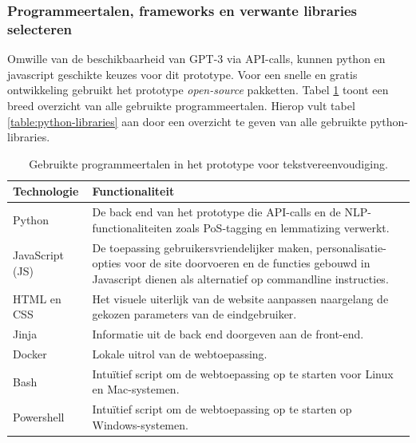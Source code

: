 \subsubsection{Programmeertalen, frameworks en verwante libraries selecteren}

Omwille van de beschikbaarheid van GPT-3 via API-calls, kunnen python en javascript geschikte keuzes voor dit prototype. Voor een snelle en gratis ontwikkeling gebruikt het prototype \textit{open-source} pakketten. Tabel \ref{table:technologies} toont een breed overzicht van alle gebruikte programmeertalen. Hierop vult tabel \ref{table:python-libraries} aan door een overzicht te geven van alle gebruikte python-libraries.

\begin{center}
	\begin{table}[H]
	\begin{tabular}{ | m{4cm} | m{11cm} | } 
		\hline
		\textbf{Technologie} 	& \textbf{Functionaliteit} \\
		\hline
		Python 					& De back end van het prototype die API-calls en de NLP-functionaliteiten zoals PoS-tagging en lemmatizing verwerkt. \\
		\hline
		JavaScript (JS)				& De toepassing gebruikersvriendelijker maken, personalisatie-opties voor de site doorvoeren en de functies gebouwd in Javascript dienen als alternatief op commandline instructies. \\
		\hline
		HTML en CSS 			& Het visuele uiterlijk van de website aanpassen naargelang de gekozen parameters van de eindgebruiker. \\
		\hline
		Jinja 					& Informatie uit de back end doorgeven aan de front-end.  \\
		\hline
		Docker 					& Lokale uitrol van de webtoepassing. \\
		\hline
		Bash					& Intuïtief script om de webtoepassing op te starten voor Linux en Mac-systemen. \\
		\hline
		Powershell 				& Intuïtief script om de webtoepassing op te starten op Windows-systemen. \\
		\hline
	\end{tabular}
	\caption{Gebruikte programmeertalen in het prototype voor tekstvereenvoudiging.}
	\label{table:technologies}
	\end{table}
\end{center}

